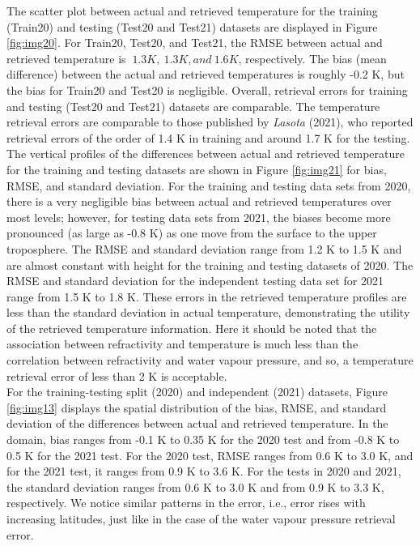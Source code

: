 \documentclass[a4paper,12pt,twoside]{article}
\begin{document}
\noindent The scatter plot between actual and retrieved temperature for the training (Train20) and testing (Test20 and Test21) datasets are displayed in Figure \ref{fig:img20}. For Train20, Test20, and Test21, the RMSE between actual and retrieved temperature is $~1.3 K, ~1.3 K, and ~1.6 K$, respectively. The bias (mean difference) between the actual and retrieved temperatures is roughly -0.2 K, but the bias for Train20 and Test20 is negligible. Overall, retrieval errors for training and testing (Test20 and Test21) datasets are comparable. The temperature retrieval errors are comparable to those published by \textit{Lasota} (2021), who reported retrieval errors of the order of 1.4 K in training and around 1.7 K for the testing. The vertical profiles of the differences between actual and retrieved temperature for the training and testing datasets are shown in Figure \ref{fig:img21} for bias, RMSE, and standard deviation. For the training and testing data sets from 2020, there is a very negligible bias between actual and retrieved temperatures over most levels; however, for testing data sets from 2021, the biases become more pronounced (as large as -0.8 K) as one move from the surface to the upper troposphere. The RMSE and standard deviation range from 1.2 K to 1.5 K and are almost constant with height for the training and testing datasets of 2020. The RMSE and standard deviation for the independent testing data set for 2021 range from 1.5 K to 1.8 K. These errors in the retrieved temperature profiles are less than the standard deviation in actual temperature, demonstrating the utility of the retrieved temperature information. Here it should be noted that the association between refractivity and temperature is much less than the correlation between refractivity and water vapour pressure, and so, a temperature retrieval error of less than 2 K is acceptable. \\

\noindent For the training-testing split (2020) and independent (2021) datasets, Figure \ref{fig:img13} displays the spatial distribution of the bias, RMSE, and standard deviation of the differences between actual and retrieved temperature. In the domain, bias ranges from -0.1 K to 0.35 K for the 2020 test and from -0.8 K to 0.5 K for the 2021 test. For the 2020 test, RMSE ranges from 0.6 K to 3.0 K, and for the 2021 test, it ranges from 0.9 K to 3.6 K. For the tests in 2020 and 2021, the standard deviation ranges from 0.6 K to 3.0 K and from 0.9 K to 3.3 K, respectively. We notice similar patterns in the error, i.e., error rises with increasing latitudes, just like in the case of the water vapour pressure retrieval error. \\
\end{document}
